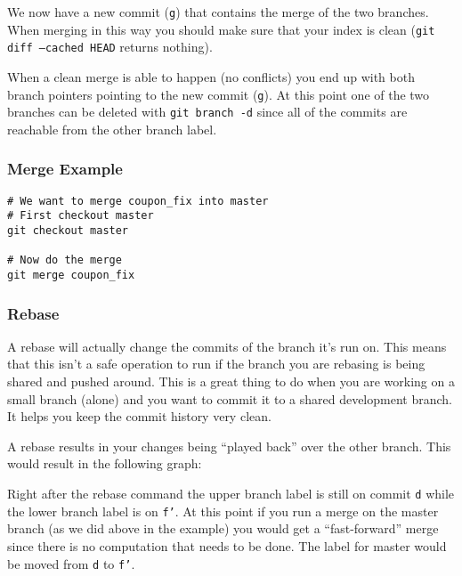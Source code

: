 \documentclass[letterpaper,12pt]{article}
\begin{document}

We now have a new commit (\texttt{g}) that contains the merge of the two
branches. When merging in this way you should make sure that your index is clean
(\texttt{git diff --cached HEAD} returns nothing).

When a clean merge is able to happen (no conflicts) you end up with both branch
pointers pointing to the new commit (\texttt{g}). At this point one of the two
branches can be deleted with \texttt{git branch -d} since all of the commits are
reachable from the other branch label.

\subsubsection{Merge Example}

\begin{verbatim}
# We want to merge coupon_fix into master
# First checkout master
git checkout master

# Now do the merge
git merge coupon_fix
\end{verbatim}

\subsubsection{Rebase}

A rebase will actually change the commits of the branch it's run on. This means
that this isn't a safe operation to run if the branch you are rebasing is being
shared and pushed around. This is a great thing to do when you are working on a
small branch (alone) and you want to commit it to a shared development
branch. It helps you keep the commit history very clean.

A rebase results in your changes being ``played back'' over the other
branch. This would result in the following graph:


Right after the rebase command the upper branch label is still on commit
\texttt{d} while the lower branch label is on \texttt{f'}. At this point if you
run a merge on the master branch (as we did above in the example) you would get
a ``fast-forward'' merge since there is no computation that needs to be
done. The label for master would be moved from \texttt{d} to \texttt{f'}.
\end{document}
